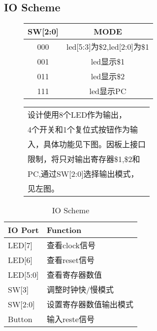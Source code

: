 \documentclass[a4paper]{article}
\begin{document}
    \subsection{IO Scheme}
        \begin{figure}[h]
        \begin{minipage}[t]{0.51\linewidth}
        \centering
        \begin{tabular}{cc}
          \toprule
          SW[2:0] & MODE\\
          \midrule
          000 & led[5:3]为\$2,led[2:0]为\$1 \\
          001 & led显示\$1 \\
          011 & led显示\$2 \\
          111 & led显示PC \\
          \bottomrule
        \end{tabular}
        \end{minipage}%
        \begin{minipage}[t]{0.49\linewidth}
        \centering
        \begin{tabular}{l}
        \qquad    设计使用8个LED作为输出，\\
        4个开关和1个复位式按钮作为输\\
        入，具体功能见下图。因板上接口\\
        限制，将只对输出寄存器\$1,\$2和\\
        PC,通过SW[2:0]选择输出模式，\\
        见左图。\\
        \end{tabular}

        \end{minipage}
    \end{figure}

    \begin{table}[h]
        \centering
        \begin{tabular}{ll}
              \toprule
              IO Port & Function\\
              \midrule
              LED[7]    &   查看clock信号 \\
              LED[6]    &   查看reset信号 \\
              LED[5:0]  &   查看寄存器数值 \\
              SW[3]     &   调整时钟快/慢模式 \\
              SW[2:0]   &   设置寄存器数值输出模式 \\
              Button    &   输入reste信号 \\
              \bottomrule
            \end{tabular}
            \caption{IO Scheme}

    \end{table}
\end{document}
